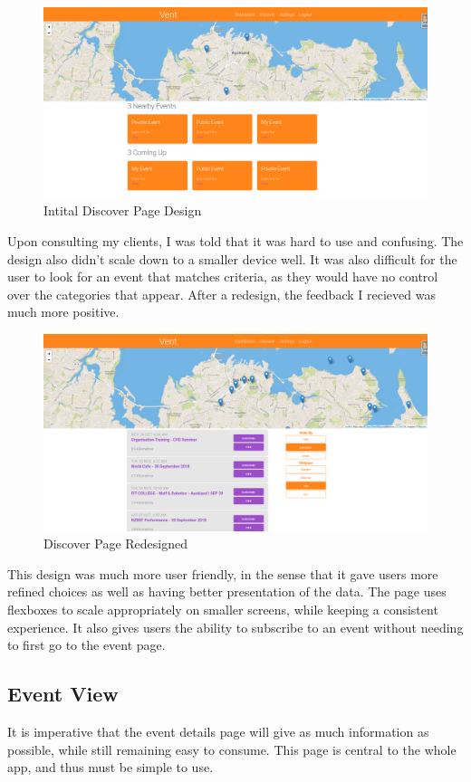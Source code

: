 \documentclass[a4paper,oneside,12pt]{report}
\begin{document}
	\begin{figure}[H]
		\caption{Intital Discover Page Design}
		\includegraphics[width=\linewidth]{static/front-end5.png}
	\end{figure}
	
	Upon consulting my clients, I was told that it was hard to use and confusing. The design also didn't scale down to a smaller device well. It was also difficult for the user to look for an event that matches criteria, as they would have no control over the categories that appear. After a redesign, the feedback I recieved was much more positive.

	\begin{figure}[H]
		\caption{Discover Page Redesigned}
		\includegraphics[width=\linewidth]{static/front-end4.png}
	\end{figure}
	
	This design was much more user friendly, in the sense that it gave users more refined choices as well as having better presentation of the data. The page uses flexboxes to scale appropriately on smaller screens, while keeping a consistent experience. It also gives users the ability to subscribe to an event without needing to first go to the event page.

	\subsection{Event View}
	It is imperative that the event details page will give as much information as possible, while still remaining easy to consume. This page is central to the whole app, and thus must be simple to use.
\end{document}
